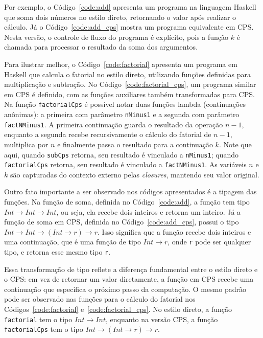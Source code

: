 Por exemplo, o Código~\ref{code:add} apresenta um programa na linguagem Haskell que soma dois números no estilo direto, retornando o valor após realizar o cálculo.
Já o Código~\ref{code:add_cps} mostra um programa equivalente em CPS\@.
Nesta versão, o controle de fluxo do programa é explícito, pois a função $k$ é chamada para processar o resultado da soma dos argumentos.





Para ilustrar melhor, o Código~\ref{code:factorial} apresenta um programa em Haskell que calcula o fatorial no estilo direto, utilizando funções definidas para multiplicação e subtração.
No Código~\ref{code:factorial_cps}, um programa similar em CPS é definido, com as funções auxiliares também transformadas para CPS\@.
Na função \texttt{factorialCps} é possível notar duas funções lambda (continuações anônimas): a primeira com parâmetro \texttt{nMinus1} e a segunda com parâmetro \texttt{factNMinus1}.
A primeira continuação guarda o resultado da operação $n - 1$, enquanto a segunda recebe recursivamente o cálculo do fatorial de $n - 1$, multiplica por $n$ e finalmente passa o resultado para a continuação $k$.
Note que aqui, quando \texttt{subCps} retorna, seu resultado é vinculado a \texttt{nMinus1}; quando \texttt{factorialCps} retorna, seu resultado é vinculado a \texttt{factNMinus1}.
As variáveis $n$ e $k$ são capturadas do contexto externo pelas \textit{closures}, mantendo seu valor original.

Outro fato importante a ser observado nos códigos apresentados é a tipagem das funções.
Na função de soma, definida no Código~\ref{code:add}, a função tem tipo $Int \rightarrow Int \rightarrow Int$, ou seja, ela recebe dois inteiros e retorna um inteiro.
Já a função de soma em CPS, definida no Código~\ref{code:add_cps}, possui o tipo $Int \rightarrow Int \rightarrow (Int \rightarrow r) \rightarrow r$. Isso significa que a função recebe dois inteiros e uma continuação, que é uma função de tipo $Int \rightarrow r$, onde \texttt{r} pode ser qualquer tipo, e retorna esse mesmo tipo \texttt{r}.

Essa transformação de tipo reflete a diferença fundamental entre o estilo direto e o CPS\@: em vez de retornar um valor diretamente, a função em CPS recebe uma continuação que especifica o próximo passo da computação.
O mesmo padrão pode ser observado nas funções para o cálculo do fatorial nos Códigos~\ref{code:factorial} e~\ref{code:factorial_cps}.
No estilo direto, a função \texttt{factorial} tem o tipo $Int \rightarrow Int$, enquanto na versão CPS, a função \texttt{factorialCps} tem o tipo $Int \rightarrow (Int \rightarrow r) \rightarrow r$.

